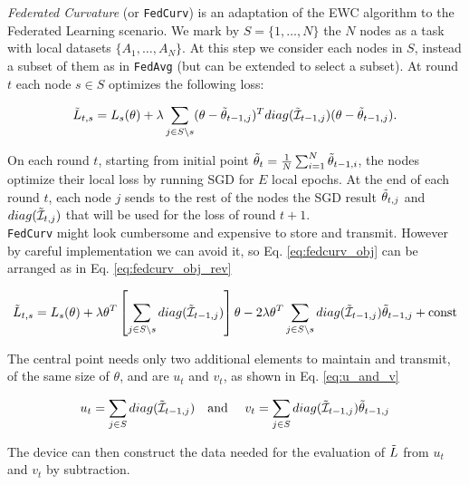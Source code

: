 \textit{Federated Curvature} (or \texttt{FedCurv}) is an adaptation of the EWC algorithm to the Federated Learning scenario. We mark by $S=\{1, \dots, N\}$ the $N$ nodes as a task with local datasets $\{A_1, \dots, A_N\}$. At this step we consider each nodes in $S$, instead a subset of them as in \texttt{FedAvg} (but can be extended to select a subset). At round $t$ each node $s\in S$ optimizes the following loss:

\begin{equation}\label{eq:fedcurv_obj}
    \Tilde{L}_{t,s}=L_s(\theta)+\lambda\sum_{j\in S\backslash s}(\theta-\Tilde{\theta}_{t-1,j})^T diag(\Tilde{\mathcal{I}}_{t-1,j})(\theta-\Tilde{\theta}_{t-1,j}).
\end{equation}

On each round $t$, starting from initial point $\Tilde{\theta}_t=\frac{1}{N}\sum_{i=1}^N \Tilde{\theta}_{t-1,i}$, the nodes optimize their local loss by running SGD for $E$ local epochs. At the end of each round $t$, each node $j$ sends to the rest of the nodes the SGD result $\Tilde{\theta}_{t,j}$ and $diag(\Tilde{\mathcal{I}}_{t,j})$ that will be used for the loss of round $t+1$. \\

\texttt{FedCurv} might look cumbersome and expensive to store and transmit. However by careful implementation we can avoid it, so Eq. \ref{eq:fedcurv_obj} can be arranged as in Eq. \ref{eq:fedcurv_obj_rev}

\begin{equation}\label{eq:fedcurv_obj_rev}
    \Tilde{L}_{t,s}=L_s(\theta)+\lambda\theta^T\left[ \sum_{j\in S\backslash s} diag(\Tilde{\mathcal{I}}_{t-1,j}) \right]\theta-2\lambda\theta^T \sum_{j\in S\backslash s} diag(\Tilde{\mathcal{I}}_{t-1,j})\Tilde{\theta}_{t-1,j}+\text{const}
\end{equation}

The central point needs only two additional elements to maintain and transmit, of the same size of $\theta$, and are $u_t$ and $v_t$, as shown in Eq. \ref{eq:u_and_v}

\begin{equation}\label{eq:u_and_v}
    u_t=\sum_{j\in S} diag(\Tilde{\mathcal{I}}_{t-1,j}) \text{\quad and \quad} v_t=\sum_{j\in S} diag(\Tilde{\mathcal{I}}_{t-1,j})\Tilde{\theta}_{t-1,j}
\end{equation}

The device can then construct the data needed for the evaluation of $\Tilde{L}$ from $u_t$ and $v_t$ by subtraction. \\

